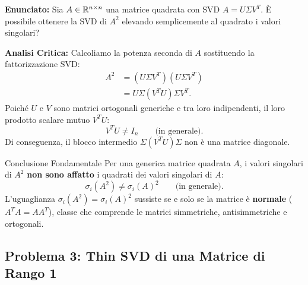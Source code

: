 \begin{example}
\textbf{Enunciato:} Sia $A \in \mathbb{R}^{n \times n}$ una matrice quadrata con SVD $A = U \Sigma V^T$. \`E possibile ottenere la SVD di $A^2$ elevando semplicemente al quadrato i valori singolari?

\medskip
\textbf{Analisi Critica:}
Calcoliamo la potenza seconda di $A$ sostituendo la fattorizzazione SVD:
\begin{align}
    A^2 &= (U \Sigma V^T)(U \Sigma V^T) \nonumber \\
        &= U \Sigma (V^T U) \Sigma V^T.
\end{align}
Poich\'e $U$ e $V$ sono matrici ortogonali generiche e tra loro indipendenti, il loro prodotto scalare mutuo $V^T U$:
\begin{equation}
    V^T U \neq I_n \qquad \text{(in generale)}.
\end{equation}
Di conseguenza, il blocco intermedio $\Sigma (V^T U) \Sigma$ non \`e una matrice diagonale. 

\begin{alertblock}{Conclusione Fondamentale}
Per una generica matrice quadrata $A$, i valori singolari di $A^2$ \textbf{non sono affatto} i quadrati dei valori singolari di $A$:
\begin{equation}
    \sigma_i(A^2) \neq \sigma_i(A)^2 \qquad \text{(in generale)}.
\end{equation}
L'uguaglianza $\sigma_i(A^2) = \sigma_i(A)^2$ sussiste se e solo se la matrice \`e \textbf{normale} ($A^T A = A A^T$), classe che comprende le matrici simmetriche, antisimmetriche e ortogonali.
\end{alertblock}
\end{example}

\subsection{Problema 3: Thin SVD di una Matrice di Rango 1}

